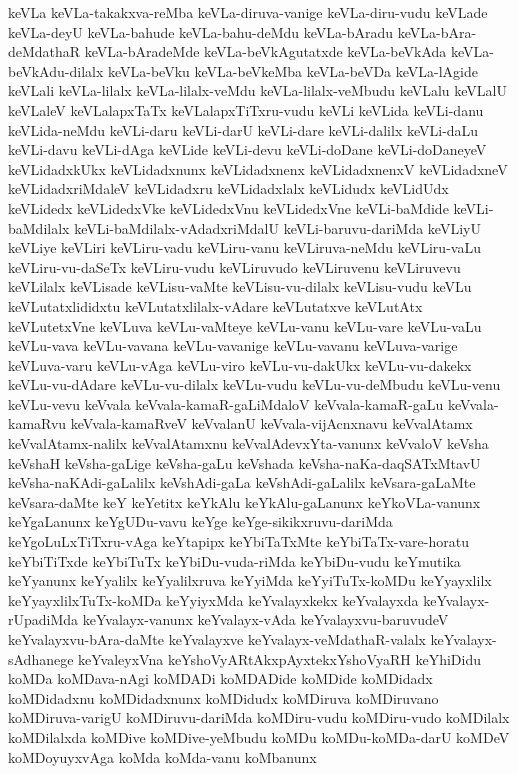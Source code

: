 {keVLa
keVLa-takakxva-reMba
keVLa-diruva-vanige
keVLa-diru-vudu
keVLade
keVLa-deyU
keVLa-bahude
keVLa-bahu-deMdu
keVLa-bAradu
keVLa-bAra-deMdathaR
keVLa-bAradeMde
keVLa-beVkAgutatxde
keVLa-beVkAda
keVLa-beVkAdu-dilalx
keVLa-beVku
keVLa-beVkeMba
keVLa-beVDa
keVLa-lAgide
keVLali
keVLa-lilalx
keVLa-lilalx-veMdu
keVLa-lilalx-veMbudu
keVLalu
keVLalU
keVLaleV
keVLalapxTaTx
keVLalapxTiTxru-vudu
keVLi
keVLida
keVLi-danu
keVLida-neMdu
keVLi-daru
keVLi-darU
keVLi-dare
keVLi-dalilx
keVLi-daLu
keVLi-davu
keVLi-dAga
keVLide
keVLi-devu
keVLi-doDane
keVLi-doDaneyeV
keVLidadxkUkx
keVLidadxnunx
keVLidadxnenx
keVLidadxnenxV
keVLidadxneV
keVLidadxriMdaleV
keVLidadxru
keVLidadxlalx
keVLidudx
keVLidUdx
keVLidedx
keVLidedxVke
keVLidedxVnu
keVLidedxVne
keVLi-baMdide
keVLi-baMdilalx
keVLi-baMdilalx-vAdadxriMdalU
keVLi-baruvu-dariMda
keVLiyU
keVLiye
keVLiri
keVLiru-vadu
keVLiru-vanu
keVLiruva-neMdu
keVLiru-vaLu
keVLiru-vu-daSeTx
keVLiru-vudu
keVLiruvudo
keVLiruvenu
keVLiruvevu
keVLilalx
keVLisade
keVLisu-vaMte
keVLisu-vu-dilalx
keVLisu-vudu
keVLu
keVLutatxlididxtu
keVLutatxlilalx-vAdare
keVLutatxve
keVLutAtx
keVLutetxVne
keVLuva
keVLu-vaMteye
keVLu-vanu
keVLu-vare
keVLu-vaLu
keVLu-vava
keVLu-vavana
keVLu-vavanige
keVLu-vavanu
keVLuva-varige
keVLuva-varu
keVLu-vAga
keVLu-viro
keVLu-vu-dakUkx
keVLu-vu-dakekx
keVLu-vu-dAdare
keVLu-vu-dilalx
keVLu-vudu
keVLu-vu-deMbudu
keVLu-venu
keVLu-vevu
keVvala
keVvala-kamaR-gaLiMdaloV
keVvala-kamaR-gaLu
keVvala-kamaRvu
keVvala-kamaRveV
keVvalanU
keVvala-vijAcnxnavu
keVvalAtamx
keVvalAtamx-nalilx
keVvalAtamxnu
keVvalAdevxYta-vanunx
keVvaloV
keVsha
keVshaH
keVsha-gaLige
keVsha-gaLu
keVshada
keVsha-naKa-daqSATxMtavU
keVsha-naKAdi-gaLalilx
keVshAdi-gaLa
keVshAdi-gaLalilx
keVsara-gaLaMte
keVsara-daMte
keY
keYetitx
keYkAlu
keYkAlu-gaLanunx
keYkoVLa-vanunx
keYgaLanunx
keYgUDu-vavu
keYge
keYge-sikikxruvu-dariMda
keYgoLuLxTiTxru-vAga
keYtapipx
keYbiTaTxMte
keYbiTaTx-vare-horatu
keYbiTiTxde
keYbiTuTx
keYbiDu-vuda-riMda
keYbiDu-vudu
keYmutika
keYyanunx
keYyalilx
keYyalilxruva
keYyiMda
keYyiTuTx-koMDu
keYyayxlilx
keYyayxlilxTuTx-koMDa
keYyiyxMda
keYvalayxkekx
keYvalayxda
keYvalayx-rUpadiMda
keYvalayx-vanunx
keYvalayx-vAda
keYvalayxvu-baruvudeV
keYvalayxvu-bAra-daMte
keYvalayxve
keYvalayx-veMdathaR-valalx
keYvalayx-sAdhanege
keYvaleyxVna
keYshoVyARtAkxpAyxtekxYshoVyaRH
keYhiDidu
koMDa
koMDava-nAgi
koMDADi
koMDADide
koMDide
koMDidadx
koMDidadxnu
koMDidadxnunx
koMDidudx
koMDiruva
koMDiruvano
koMDiruva-varigU
koMDiruvu-dariMda
koMDiru-vudu
koMDiru-vudo
koMDilalx
koMDilalxda
koMDive
koMDive-yeMbudu
koMDu
koMDu-koMDa-darU
koMDeV
koMDoyuyxvAga
koMda
koMda-vanu
koMbanunx
}
